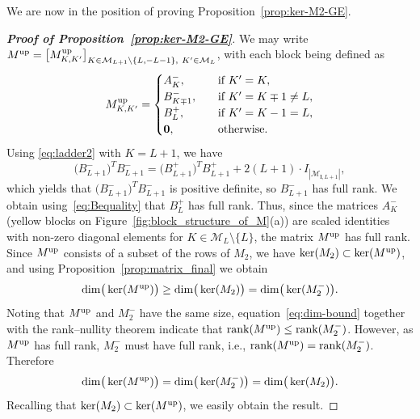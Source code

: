 \documentclass{article}
\newcommand{\card}[1]{|{#1}|}
\numberwithin{equation}{section}
\def\bl{{\bm l}}
\def\calM{\mathcal{M}}
\def\MlL{{M}}
\def\dim{{{\rm dim}}}
\def\Mm{M^{-}}
\def\Am{A^{-}}
\def\Bp{B^{+}}
\def\Bm{B^{-}}
\def\Mup{{\MlL}^{\textup{up}}}
\begin{document}
We are now in the position of proving Proposition~\ref{prop:ker-M2-GE}. 

\begin{proof}[\bf{Proof of Proposition~\ref{prop:ker-M2-GE}}]
    We may write
    $\Mup=\big[\Mup_{K,K'}\big]_{K\in\calM_{L+1}\backslash \{L,-L-1\},~K'\in\calM_L}$, with each block being defined as
    \begin{equation*}
    \Mup_{K,K'} = \begin{cases}
        \Am_{K}, 
        \quad & \textup{if } K'=K, \\
        \Bm_{K\mp1}, 
        \quad & \textup{if } K'=K\mp1\ne L, \\
        \Bp_{L}, 
        \quad & \textup{if } K'=K-1=L, \\
        \mathbf{0}, \quad &\textup{otherwise.}
        \end{cases}
    \end{equation*}
    Using \eqref{eq:ladder2} with $K=L+1$, we have
    \begin{equation*}
        \big(\Bm_{L+1}\big)^T\Bm_{L+1} = \big(\Bp_{L+1}\big)^T\Bp_{L+1} +2(L+1) \cdot I_{\card{\calM_{\bl,L+1}}},
    \end{equation*}
    which yields that $\big(\Bm_{L+1}\big)^T\Bm_{L+1}$ is positive definite, so $\Bm_{L+1}$ has full rank. We obtain using~\eqref{eq:Bequality} that $\Bp_{L}$ has full rank.
    Thus, since the matrices $\Am_{K}$ 
    (yellow blocks on Figure~\ref{fig:block_structure_of_M}(a)) are scaled identities with non-zero diagonal elements for $K\in\calM_L\setminus \{L\}$, the matrix $\Mup$ has full rank.
    Since $\Mup$ consists of a subset of the rows of $\MlL_2$, we have $\ker(\MlL_2)\subset\ker(\Mup)$, 
    and using Proposition~\ref{prop:matrix_final}
    we obtain
    \begin{equation}\label{eq:dim-bound}
        \dim\big(\ker(\Mup)\big)\ge \dim\big(\ker(\MlL_2)\big)=\dim\big(\ker(\Mm_2)\big).
    \end{equation}
    Noting that $\Mup$ and $\Mm_2$ have the same size, equation~\eqref{eq:dim-bound} together with the rank–nullity theorem indicate that $\text{rank}(\Mup)\le\text{rank}(\Mm_2)$. However, as $\Mup$ has full rank, $\Mm_2$ must have full rank, i.e., $\text{rank}(\Mup)=\text{rank}(\Mm_2)$. Therefore
    \[
        \dim\big(\ker(\Mup)\big)=\dim\big(\ker(\Mm_2)\big) = \dim\big(\ker(\MlL_2)\big).
    \]
    Recalling that $\ker(\MlL_2)\subset\ker(\Mup)$, we easily obtain the result.
\end{proof}
\end{document}
